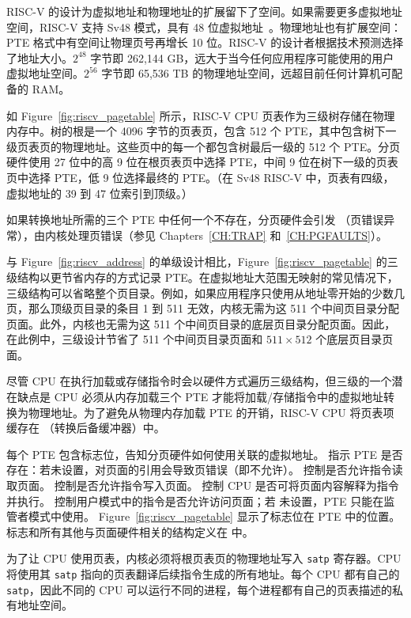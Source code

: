RISC-V 的设计为虚拟地址和物理地址的扩展留下了空间。如果需要更多虚拟地址空间，RISC-V 支持 Sv48 模式，具有 48 位虚拟地址~\cite{riscv:priv}。物理地址也有扩展空间：PTE 格式中有空间让物理页号再增长 10 位。RISC-V 的设计者根据技术预测选择了地址大小。$2^{48}$ 字节即 262,144 GB，远大于当今任何应用程序可能使用的用户虚拟地址空间。$2^{56}$ 字节即 65,536 TB 的物理地址空间，远超目前任何计算机可配备的 RAM。

如
Figure~\ref{fig:riscv_pagetable}
所示，RISC-V CPU 页表作为三级树存储在物理内存中。树的根是一个 4096 字节的页表页，包含 512 个 PTE，其中包含树下一级页表页的物理地址。这些页中的每一个都包含树最后一级的 512 个 PTE。分页硬件使用 27 位中的高 9 位在根页表页中选择 PTE，中间 9 位在树下一级的页表页中选择 PTE，低 9 位选择最终的 PTE。（在 Sv48 RISC-V 中，页表有四级，虚拟地址的 39 到 47 位索引到顶级。）

如果转换地址所需的三个 PTE 中任何一个不存在，分页硬件会引发 （页错误异常），由内核处理页错误（参见 Chapters~\ref{CH:TRAP} 和~\ref{CH:PGFAULTS}）。

与 Figure~\ref{fig:riscv_address} 的单级设计相比，Figure~\ref{fig:riscv_pagetable} 的三级结构以更节省内存的方式记录 PTE。在虚拟地址大范围无映射的常见情况下，三级结构可以省略整个页目录。例如，如果应用程序只使用从地址零开始的少数几页，那么顶级页目录的条目 1 到 511 无效，内核无需为这 511 个中间页目录分配页面。此外，内核也无需为这 511 个中间页目录的底层页目录分配页面。因此，在此例中，三级设计节省了 511 个中间页目录页面和 $511\times512$ 个底层页目录页面。

尽管 CPU 在执行加载或存储指令时会以硬件方式遍历三级结构，但三级的一个潜在缺点是 CPU 必须从内存加载三个 PTE 才能将加载/存储指令中的虚拟地址转换为物理地址。为了避免从物理内存加载 PTE 的开销，RISC-V CPU 将页表项缓存在
（转换后备缓冲器）中。

每个 PTE 包含标志位，告知分页硬件如何使用关联的虚拟地址。
指示 PTE 是否存在：若未设置，对页面的引用会导致页错误（即不允许）。
控制是否允许指令读取页面。
控制是否允许指令写入页面。
控制 CPU 是否可将页面内容解释为指令并执行。
控制用户模式中的指令是否允许访问页面；若
未设置，PTE 只能在监管者模式中使用。
Figure~\ref{fig:riscv_pagetable}
显示了标志位在 PTE 中的位置。标志和所有其他与页面硬件相关的结构定义在
中。

为了让 CPU 使用页表，内核必须将根页表页的物理地址写入
\texttt{satp}
寄存器。CPU 将使用其 \texttt{satp} 指向的页表翻译后续指令生成的所有地址。每个 CPU 都有自己的 \texttt{satp}，因此不同的 CPU 可以运行不同的进程，每个进程都有自己的页表描述的私有地址空间。

